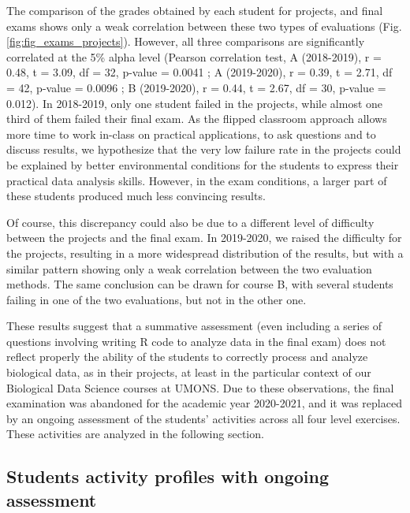 \documentclass{aims}
\theoremstyle{definition}
\begin{document}
The comparison of the grades obtained by each student for projects, and
final exams shows only a weak correlation between these two types of
evaluations (Fig. \ref {fig:fig_exams_projects}). However, all three
comparisons are significantly correlated at the 5\% alpha level (Pearson
correlation test, A (2018-2019), r = 0.48, t = 3.09, df = 32, p-value =
0.0041 ; A (2019-2020), r = 0.39, t = 2.71, df = 42, p-value = 0.0096 ;
B (2019-2020), r = 0.44, t = 2.67, df = 30, p-value = 0.012). In
2018-2019, only one student failed in the projects, while almost one
third of them failed their final exam. As the flipped classroom approach
allows more time to work in-class on practical applications, to ask
questions and to discuss results, we hypothesize that the very low
failure rate in the projects could be explained by better environmental
conditions for the students to express their practical data analysis
skills. However, in the exam conditions, a larger part of these students
produced much less convincing results.

Of course, this discrepancy could also be due to a different level of
difficulty between the projects and the final exam. In 2019-2020, we
raised the difficulty for the projects, resulting in a more widespread
distribution of the results, but with a similar pattern showing only a
weak correlation between the two evaluation methods. The same conclusion
can be drawn for course B, with several students failing in one of the
two evaluations, but not in the other one.

These results suggest that a summative assessment (even including a
series of questions involving writing R code to analyze data in the
final exam) does not reflect properly the ability of the students to
correctly process and analyze biological data, as in their projects, at
least in the particular context of our Biological Data Science courses
at UMONS. Due to these observations, the final examination was abandoned
for the academic year 2020-2021, and it was replaced by an ongoing
assessment of the students' activities across all four level exercises.
These activities are analyzed in the following section.

\hypertarget{students-activity-profiles-with-ongoing-assessment-1}{%
\subsection{Students activity profiles with ongoing
assessment}\label{students-activity-profiles-with-ongoing-assessment-1}}
\end{document}
